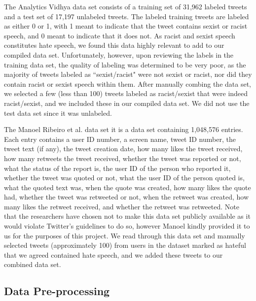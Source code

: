 \documentclass[conference]{sig-alternate-05-2015}
\begin{document}
The Analytics Vidhya data set consists of a training set of 31,962 labeled tweets and a test set of 17,197 unlabeled tweets. The labeled training tweets are labeled as either 0 or 1, with 1 meant to indicate that the tweet contains sexist or racist speech, and 0 meant to indicate that it does not. As racist and sexist speech constitutes hate speech, we found this data highly relevant to add to our compiled data set. Unfortunately, however, upon reviewing the labels in the training data set, the quality of labeling was determined to be very poor, as the majority of tweets labeled as ``sexist/racist" were not sexist or racist, nor did they contain racist or sexist speech within them. After manually combing the data set, we selected a few (less than 100) tweets labeled as racist/sexist that were indeed racist/sexist, and we included these in our compiled data set. We did not use the test data set since it was unlabeled.

The Manoel Ribeiro et al. data set it is a data set containing 1,048,576 entries. Each entry contains a user ID number, a screen name, tweet ID number, the tweet text (if any), the tweet creation date, how many likes the tweet received, how many retweets the tweet received, whether the tweet was reported or not, what the status of the report is, the user ID of the person who reported it,  whether the tweet was quoted or not, what the user ID of the person quoted is, what the quoted text was, when the quote was created, how many likes the quote had, whether the tweet was retweeted or not, when the retweet was created, how many likes the retweet received, and whether the retweet was retweeted. Note that the researchers have chosen not to make this data set publicly available as it would violate Twitter's guidelines to do so, however Manoel kindly provided it to us for the purposes of this project. We read through this data set and manually selected tweets (approximately 100) from users in the dataset marked as hateful that we agreed contained hate speech, and we added these tweets to our combined data set.

\subsection{Data Pre-processing}
\end{document}
